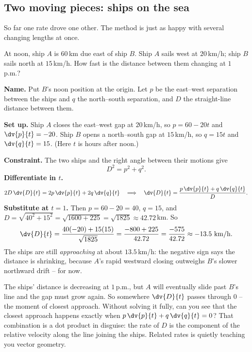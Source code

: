 \subsection{Two moving pieces: ships on the sea}

So far one rate drove one other. The method is just as happy with several changing lengths at once.

\begin{example}
\label{ch13:ex-ships}
At noon, ship $A$ is $60$\,km due east of ship $B$. Ship $A$ sails west at $20$\,km/h; ship $B$ sails
north at $15$\,km/h. How fast is the distance between them changing at $1$\,p.m.?

\textbf{Name.} Put $B$'s noon position at the origin. Let $p$ be the east--west separation between
the ships and $q$ the north--south separation, and $D$ the straight-line distance between them.

\textbf{Set up.} Ship $A$ closes the east--west gap at $20$\,km/h, so $p = 60 - 20t$ and
$\dv{p}{t} = -20$. Ship $B$ opens a north--south gap at $15$\,km/h, so $q = 15t$ and $\dv{q}{t} =
15$. (Here $t$ is hours after noon.)

\textbf{Constraint.} The two ships and the right angle between their motions give
\[
D^2 = p^2 + q^2.
\]
\textbf{Differentiate in $t$.}
\[
2D\,\dv{D}{t} = 2p\,\dv{p}{t} + 2q\,\dv{q}{t}
\quad\Longrightarrow\quad
\dv{D}{t} = \frac{p\,\dv{p}{t} + q\,\dv{q}{t}}{D}.
\]
\textbf{Substitute at $t=1$.} Then $p = 60-20 = 40$, $q = 15$, and $D = \sqrt{40^2 + 15^2} =
\sqrt{1600 + 225} = \sqrt{1825} \approx 42.72$\,km. So
\[
\dv{D}{t} = \frac{40(-20) + 15(15)}{\sqrt{1825}} = \frac{-800 + 225}{42.72}
= \frac{-575}{42.72}\approx -13.5\ \text{km/h}.
\]
The ships are still \emph{approaching} at about $13.5$\,km/h: the negative sign says the distance is
shrinking, because $A$'s rapid westward closing outweighs $B$'s slower northward drift -- for now.
\end{example}

\begin{walkbox}
The ships' distance is decreasing at $1$\,p.m., but $A$ will eventually slide past $B$'s line and the
gap must grow again. So somewhere $\dv{D}{t}$ passes through $0$ -- the moment of closest approach.
Without solving it fully, can you see that the closest approach happens exactly when $p\,\dv{p}{t} +
q\,\dv{q}{t} = 0$? That combination is a dot product in disguise: the rate of $D$ is the component of
the relative velocity along the line joining the ships. Related rates is quietly teaching you vector
geometry.
\end{walkbox}

